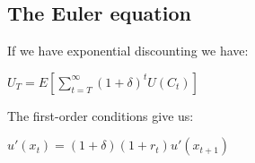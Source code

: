 
\subsection{The Euler equation}

If we have exponential discounting we have:

\(U_T=E[ \sum_{t=T}^\infty (1+\delta )^t U(C_t) ]\)

The first-order conditions give us:

\(u'(x_t)=(1+\delta)(1+r_t)u'(x_{t+1})\)

